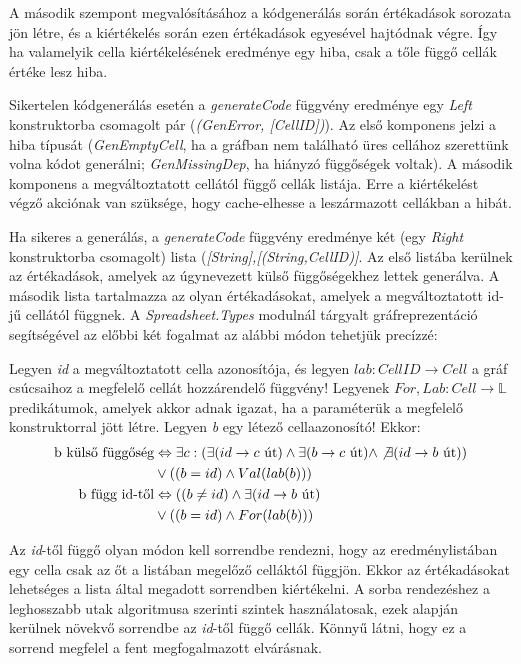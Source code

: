 A második szempont megvalósításához a kódgenerálás során értékadások sorozata jön létre, és a kiértékelés során ezen értékadások egyesével hajtódnak végre. Így ha valamelyik cella kiértékelésének eredménye egy hiba, csak a tőle függő cellák értéke lesz hiba. 

Sikertelen kódgenerálás esetén a \textit{generateCode} függvény eredménye egy \textit{Left} konstruktorba csomagolt pár (\textit{(GenError, [CellID])}). Az első komponens jelzi a hiba típusát (\textit{GenEmptyCell}, ha a gráfban nem található üres cellához szerettünk volna kódot generálni; \textit{GenMissingDep}, ha hiányzó függőségek voltak). A második komponens a megváltoztatott cellától függő cellák listája. Erre a kiértékelést végző akciónak van szüksége, hogy cache-elhesse a leszármazott cellákban a hibát.

Ha sikeres a generálás, a \textit{generateCode} függvény eredménye két (egy \textit{Right} konstruktorba csomagolt) lista (\textit{[String],[(String,CellID)]}. Az első listába kerülnek az értékadások, amelyek az úgynevezett külső függőségekhez lettek generálva. A második lista tartalmazza az olyan értékadásokat, amelyek a megváltoztatott id-jű cellától függnek. A \textit{Spreadsheet.Types} modulnál tárgyalt gráfreprezentáció segítségével az előbbi két fogalmat az alábbi módon tehetjük precízzé: 

Legyen \textit{id} a megváltoztatott cella azonosítója, és legyen $lab : CellID \rightarrow Cell$ a gráf csúcsaihoz a megfelelő cellát hozzárendelő függvény! Legyenek $For,Lab : Cell \rightarrow \mathbb{L}$ predikátumok, amelyek akkor adnak igazat, ha a paraméterük a megfelelő konstruktorral jött létre. Legyen \textit{b} egy létező cellaazonosító! Ekkor:
\begin{align*}
	\text{b külső függőség} &\Leftrightarrow \exists c: (\exists (id \rightarrow c \text{ út}) \wedge \exists (b \rightarrow c \text{ út}) \wedge \not\exists  (id \rightarrow b \text{ út})) \\
	& \vee((b=id) \wedge Val(lab(b))) \\
	\text{b függ id-től} &\Leftrightarrow ((b \not= id) \wedge \exists (id \rightarrow b \text{ út}) \\
	&\vee ((b = id) \wedge For(lab(b)))
\end{align*}

Az \textit{id}-től függő olyan módon kell sorrendbe rendezni, hogy az eredménylistában egy cella csak az őt a listában megelőző celláktól függjön. Ekkor az értékadásokat lehetséges a lista által megadott sorrendben kiértékelni. A sorba rendezéshez a leghosszabb utak algoritmusa szerinti szintek használatosak, ezek alapján kerülnek növekvő sorrendbe az \textit{id}-től függő cellák. Könnyű látni, hogy ez a sorrend megfelel a fent megfogalmazott elvárásnak.  

